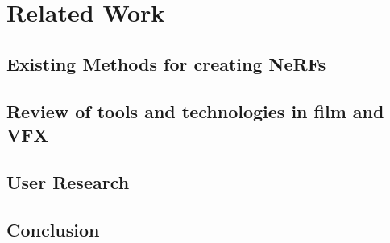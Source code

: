%
\chapter{Related Work}
\label{sec:related}



\section{Existing Methods for creating NeRFs}
\label{sec:related:nerf}


\section{Review of tools and technologies in film and VFX}
\label{sec:related:vfx}


\section{User Research}
\label{sec:related:ux}


\section{Conclusion}
\label{sec:related:conclusion}

